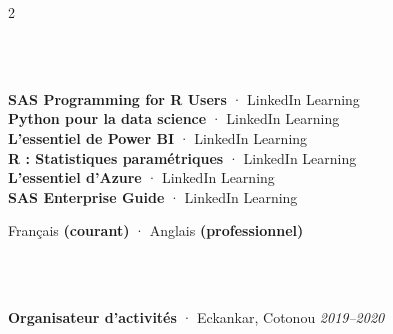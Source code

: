 \documentclass[9pt,a4paper,ragged2e,withhyper]{altacv}
\begin{document}
\begin{paracol}{2}
\vspace{2pt}

\vspace{2pt}
\\[2pt]
\\[2pt]

{\scriptsize
\textbf{\color{accent}SAS Programming for R Users} · LinkedIn Learning\\[1pt]
\textbf{\color{accent}Python pour la data science} · LinkedIn Learning\\[1pt]
\textbf{\color{accent}L'essentiel de Power BI} · LinkedIn Learning\\[1pt]
\textbf{\color{accent}R : Statistiques paramétriques} · LinkedIn Learning\\[1pt]
\textbf{\color{accent}L'essentiel d'Azure} · LinkedIn Learning\\[1pt]
\textbf{\color{accent}SAS Enterprise Guide} · LinkedIn Learning
}

{\small Français \textbf{(courant)} · Anglais \textbf{(professionnel)}}

\\[2pt]
\\[2pt]

{\scriptsize\textbf{\color{accent}Organisateur d'activités} · Eckankar, Cotonou \hfill \textit{2019--2020}}

\end{paracol}
\end{document}
